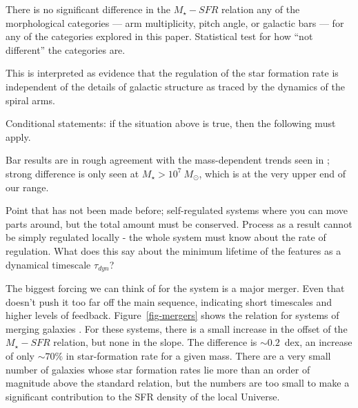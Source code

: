 \documentclass{emulateapj}
\begin{document}
There is no significant difference in the $M_\star-SFR$ relation any of the morphological categories --- arm multiplicity, pitch angle, or galactic bars --- for any of the categories explored in this paper. Statistical test for how ``not different'' the categories are. 

This is interpreted as evidence that the regulation of the star formation rate is independent of the details of galactic structure as traced by the dynamics of the spiral arms. 

Conditional statements: if the situation above is true, then the following must apply. 

Bar results are in rough agreement with the mass-dependent trends seen in \citet{ell11}; strong difference is only seen at $M_\star>10^7~M_\odot$, which is at the very upper end of our range.

Point that has not been made before; self-regulated systems where you can move parts around, but the total amount must be conserved. Process as a result cannot be simply regulated locally - the whole system must know about the rate of regulation. What does this say about the minimum lifetime of the features as a dynamical timescale $\tau_{dyn}$? 

The biggest forcing we can think of for the system is a major merger. Even that doesn't push it too far off the main sequence, indicating short timescales and higher levels of feedback. Figure~\ref{fig-mergers} shows the relation for systems of merging galaxies \citep{dar10a}. For these systems, there is a small increase in the offset of the $M_\star-SFR$ relation, but none in the slope. The difference is $\sim0.2$~dex, an increase of only $\sim70\%$ in star-formation rate for a given mass. There are a very small number of galaxies whose star formation rates lie more than an order of magnitude above the standard relation, but the numbers are too small to make a significant contribution to the SFR density of the local Universe. 
\end{document}
